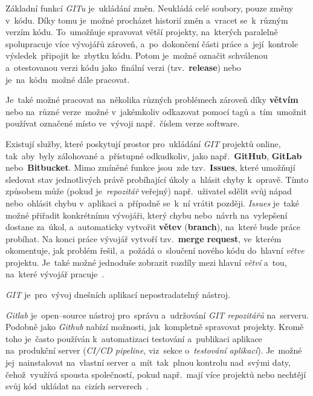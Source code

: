 \documentclass[11pt,a4paper]{report}
\begin{document}
            Základní funkcí \emph{GITu} je~ukládání změn. Neukládá celé soubory, pouze změny v~kódu. Díky tomu je~možné procházet historií změn a~vracet se~k~různým verzím kódu. To~umožňuje spravovat větší projekty, na~kterých paralelně spolupracuje více vývojářů zároveň, a~po~dokončení části práce a~její~kontrole výsledek~připojit ke~zbytku kódu. Potom je~možné označit schválenou a~otestovanou verzi kódu jako~finální verzi (tzv.~\textbf{release}) nebo je~na~kódu~možné dále pracovat.
            
            Je~také možné pracovat na~několika různých problémech zároveň díky \textbf{větvím} nebo na~různé verze~možné v~jakémkoliv odkazovat pomocí tagů a~tím~umožnit používat označené místo ve~vývoji např.~číslem verze software.

            Existují služby, které poskytují prostor pro~ukládání \emph{GIT} projektů online, tak~aby~byly zálohované a~přístupné odkudkoliv, jako např.~\textbf{GitHub}, \textbf{GitLab} nebo~\textbf{Bitbucket}. Mimo zmíněné funkce jsou~zde tzv.~\textbf{Issues}, které umožňují sledovat stav jednotlivých právě probíhající úkoly a~hlásit chyby k~opravě. Tímto způsobem může (pokud je~\emph{repozitář} veřejný) např.~uživatel sdělit svůj nápad nebo~ohlásit chybu v~aplikaci a~případně se~k~ní vrátit později. \emph{Issues} je~také možné přiřadit konkrétnímu vývojáři, který chybu nebo~návrh na~vylepšení dostane za~úkol, a~automaticky vytvořit \textbf{větev} (\textbf{branch}), na~které bude práce probíhat. Na konci práce vývojář vytvoří tzv.~\textbf{merge request}, ve~kterém okomentuje, jak problém řešil, a~požádá o~sloučení nového kódu do~hlavní \emph{větve} projektu. Je~také možné jednoduše zobrazit rozdíly mezi hlavní \emph{větví} a~tou, na~které vývojář pracuje~\cite{gitscmBook}.
            
            \emph{GIT} je~pro~vývoj dnešních aplikací nepostradatelný nástroj.
            
            \emph{Gitlab} je~open--source nástroj pro~správu a~udržování \emph{GIT repozitářů} na~serveru. Podobně jako \emph{Github} nabízí možnosti, jak~kompletně spravovat projekty. Kromě toho je~často používán k~automatizaci testování a~publikaci aplikace na~produkční server (\emph{CI/CD pipeline}, viz~sekce o~\emph{testování aplikací}). Je~možné jej~nainstalovat na~vlastní server a~mít~tak~plnou kontrolu nad~svými daty, čehož~využívá spousta společností, pokud např.~mají více projektů nebo nechtějí svůj kód~ukládat na~cizích serverech~\cite{gitlab:panek2019optimalizace, gitlab:CICD, gitlab:actions}.
\end{document}
